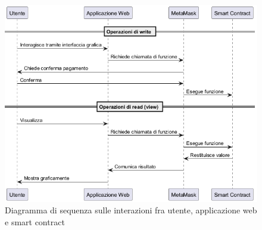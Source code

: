 \documentclass[12pt,a4paper,openright,twoside]{report}
\begin{document}
\begin{figure}[h]
\begin{center}
\includegraphics[width=\textwidth]{figures/my_interaction_diagram.png}
\caption[Diagramma delle interazioni]{Diagramma di sequenza sulle interazioni fra utente, applicazione web e smart contract}\label{fig:interaction_diagram}
\end{center}
\end{figure}


\clearpage{\pagestyle{empty}\cleardoublepage}



\end{document}
